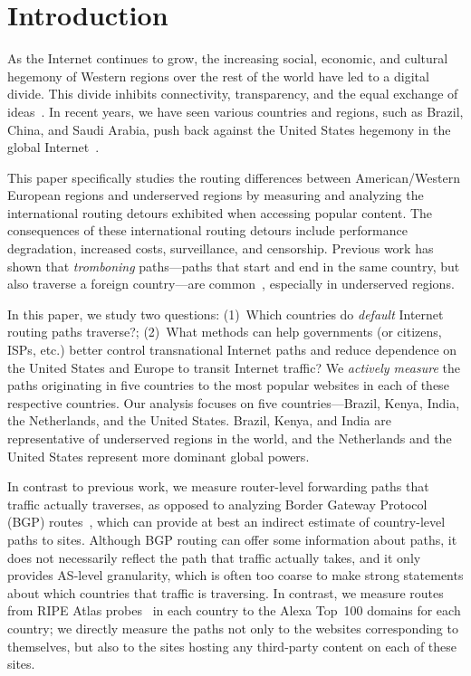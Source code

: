 \section{Introduction}
\label{sec:intro}

As the Internet continues to grow, the increasing social, economic, and
cultural hegemony of Western regions over the rest of the world have led to a
digital divide.  This divide inhibits connectivity, transparency, and the equal
exchange of ideas~\cite{hegemony}. In recent years, we have seen various
countries and regions, such as Brazil, China, and Saudi Arabia, push back
against the United States hegemony in the global 
Internet~\cite{hegemony2, hegemony_china, hegemony_EU}.  

This paper specifically studies the routing differences between American/Western European regions and 
underserved regions by measuring and analyzing the international routing detours exhibited when 
accessing popular content. The consequences of these international routing detours include performance 
degradation, increased costs, surveillance, and censorship.  Previous work has shown that {\it tromboning}
paths---paths that start and end in the same country, but also traverse a
foreign country---are common~\cite{shah2015characterizing,gupta2014peering}, especially in 
underserved regions.  

In this paper, we study two questions: (1)~Which countries do {\em   default}
Internet routing paths traverse?; (2)~What methods can  help governments (or citizens, 
ISPs, etc.) better control transnational Internet paths and reduce dependence on the United States and 
Europe to transit Internet traffic?  We {\em actively
measure} the paths originating in five countries to the most popular
websites in each of these respective countries.
Our analysis focuses on five countries---Brazil,
Kenya, India, the Netherlands, and the United States. Brazil, Kenya, and India are representative of 
underserved regions in the world, and the Netherlands and the United States represent 
more dominant global powers.   

In contrast to previous work, we measure router-level
forwarding paths that traffic actually traverses, as opposed to analyzing Border
Gateway Protocol (BGP)
routes~\cite{karlin2009nation,shah2015characterizing}, which can provide at
best an indirect estimate of country-level paths to sites.
Although BGP routing can offer some information about paths, it does not
necessarily reflect the path that traffic actually takes, and it only provides
AS-level granularity, which is often too coarse to make strong statements
about which countries that traffic is traversing.  In contrast, we measure
routes from RIPE Atlas probes~\cite{ripe_atlas} in each country to the Alexa
Top~100 domains for each country; we directly measure the paths not only to
the websites corresponding to themselves, but also to the sites hosting any
third-party content on each of these sites.

